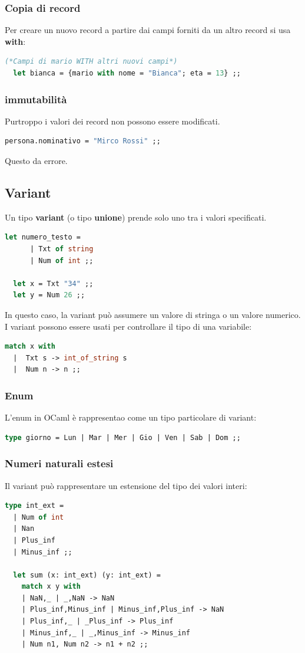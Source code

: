 \documentclass[12pt,a4paper]{article}
\begin{document}
\subsubsection{Copia di record}
Per creare un nuovo record a partire dai campi forniti da un altro record si usa \textbf{with}:
\begin{lstlisting}[language=OCaml]
  (*Campi di mario WITH altri nuovi campi*)
  let bianca = {mario with nome = "Bianca"; eta = 13} ;;
\end{lstlisting}
\subsubsection{immutabilità}
Purtroppo i valori dei record non possono essere modificati.
\begin{lstlisting}[language=OCaml]
  persona.nominativo = "Mirco Rossi" ;;
\end{lstlisting}
Questo da errore.

\subsection{Variant}
Un tipo \textbf{variant} (o tipo \textbf{unione}) prende solo uno tra i valori specificati.
\begin{lstlisting}[language=OCaml]
  let numero_testo = 
      | Txt of string
      | Num of int ;;
  
  let x = Txt "34" ;;
  let y = Num 26 ;;
\end{lstlisting}
In questo caso, la variant può assumere un valore di stringa o un valore numerico.\\
I variant possono essere usati per controllare il tipo di una variabile:
\begin{lstlisting}[language=OCaml]
  match x with
  |  Txt s -> int_of_string s
  |  Num n -> n ;;
\end{lstlisting}
\subsubsection{Enum}
L'enum in OCaml è rappresentao come un tipo particolare di variant:
\begin{lstlisting}[language=OCaml]
  type giorno = Lun | Mar | Mer | Gio | Ven | Sab | Dom ;;
\end{lstlisting}
\subsubsection{Numeri naturali estesi}
Il variant può rappresentare un estensione del tipo dei valori interi:
\begin{lstlisting}[language=OCaml]
  type int_ext =
  | Num of int
  | Nan
  | Plus_inf
  | Minus_inf ;;

  let sum (x: int_ext) (y: int_ext) =
    match x y with
    | NaN,_ | _,NaN -> NaN
    | Plus_inf,Minus_inf | Minus_inf,Plus_inf -> NaN
    | Plus_inf,_ | _Plus_inf -> Plus_inf
    | Minus_inf,_ | _,Minus_inf -> Minus_inf
    | Num n1, Num n2 -> n1 + n2 ;;
\end{lstlisting}
\end{document}
